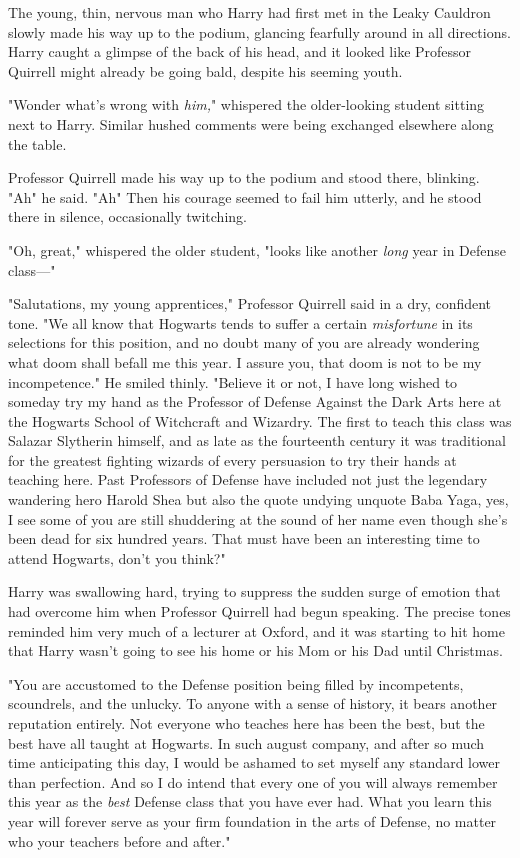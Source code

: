 The young, thin, nervous man who Harry had first met in the Leaky Cauldron
slowly made his way up to the podium, glancing fearfully around in all
directions. Harry caught a glimpse of the back of his head, and it looked like
Professor Quirrell might already be going bald, despite his seeming youth.

"Wonder what's wrong with \emph{him,}" whispered the older-looking student
sitting next to Harry. Similar hushed comments were being exchanged elsewhere
along the table.

Professor Quirrell made his way up to the podium and stood there, blinking.
"Ah{\el}" he said. "Ah{\el}" Then his courage seemed to fail him utterly,
and he stood there in silence, occasionally twitching.

"Oh, great," whispered the older student, "looks like another \emph{long} year
in Defense class\mbox{---}"

"Salutations, my young apprentices," Professor Quirrell said in a dry,
confident tone. "We all know that Hogwarts tends to suffer a certain
\emph{misfortune} in its selections for this position, and no doubt many of you
are already wondering what doom shall befall me this year. I assure you, that
doom is not to be my incompetence." He smiled thinly. "Believe it or not, I
have long wished to someday try my hand as the Professor of Defense Against the
Dark Arts here at the Hogwarts School of Witchcraft and Wizardry. The first to
teach this class was Salazar Slytherin himself, and as late as the fourteenth
century it was traditional for the greatest fighting wizards of every
persuasion to try their hands at teaching here. Past Professors of Defense have
included not just the legendary wandering hero Harold Shea but also the quote
undying unquote Baba Yaga, yes, I see some of you are still shuddering at the
sound of her name even though she's been dead for six hundred years. That must
have been an interesting time to attend Hogwarts, don't you think?"

Harry was swallowing hard, trying to suppress the sudden surge of emotion that
had overcome him when Professor Quirrell had begun speaking. The precise tones
reminded him very much of a lecturer at Oxford, and it was starting to hit home
that Harry wasn't going to see his home or his Mom or his Dad until Christmas.

"You are accustomed to the Defense position being filled by incompetents,
scoundrels, and the unlucky. To anyone with a sense of history, it bears
another reputation entirely. Not everyone who teaches here has been the best,
but the best have all taught at Hogwarts. In such august company, and after so
much time anticipating this day, I would be ashamed to set myself any standard
lower than perfection. And so I do intend that every one of you will always
remember this year as the \emph{best} Defense class that you have ever had.
What you learn this year will forever serve as your firm foundation in the arts
of Defense, no matter who your teachers before and after."

